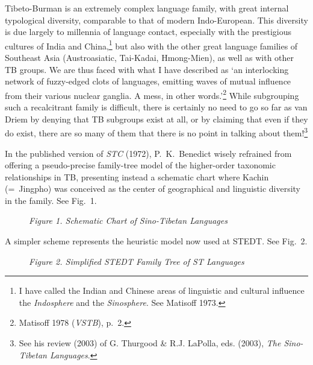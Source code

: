 Tibeto-Burman is an extremely complex language family, with great internal
typological diversity, comparable to that of modern Indo-European.  This
diversity is due largely to millennia of language contact, especially with the
prestigious cultures of India and China,\footnote{I have called the Indian and
Chinese areas of linguistic and cultural influence the \textit{Indosphere} and the
\textit{Sinosphere}. See Matisoff 1973.} but also with the other
great language families of Southeast Asia (Austroasiatic, Tai-Kadai,
Hmong-Mien), as well as with other TB groups.  We are thus faced with what I
have described as ‘an interlocking network of fuzzy-edged clots of languages,
emitting waves of mutual influence from their various nuclear ganglia.  A mess,
in other words.’\footnote{Matisoff 1978 (\textit{VSTB}), p.~2.}  While subgrouping such
a recalcitrant family is difficult, there is certainly no need to go so far as
van Driem by denying that TB subgroups exist at all, or by claiming that even if
they do exist, there are so many of them that there is no point in talking about
them!\footnote{See his review (2003) of G. Thurgood \& R.J. LaPolla, eds. (2003),
\textit{The Sino-Tibetan Languages}.}


In the published version of \textit{STC} (1972),
P.\ K.\ Benedict wisely refrained from offering a pseudo-precise family-tree model of
the higher-order taxonomic relationships in TB, presenting instead a schematic
chart where Kachin (=~Jingpho) was conceived as the center of geographical and
linguistic diversity in the family.  See Fig.~1.

\begin{figure}[ht]
\begin{center}
\textit{Figure 1. Schematic Chart of Sino-Tibetan Languages}\footnotemark
\end{center}
\end{figure}

A simpler scheme represents the heuristic model now used at STEDT.  See Fig.~2.

\begin{figure}[ht]
\begin{center}
\textit{Figure 2.  Simplified STEDT Family Tree of ST Languages}
\end{center}
\end{figure}

